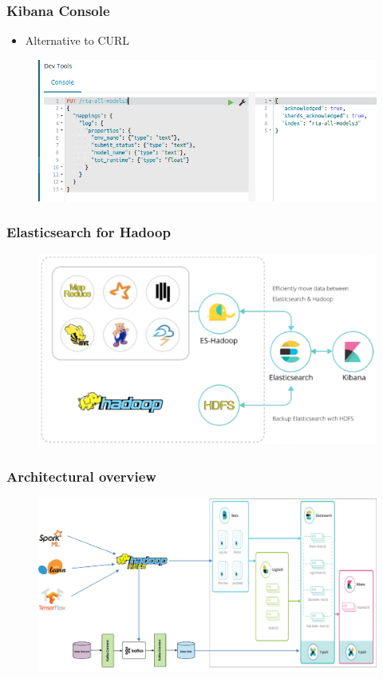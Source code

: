 \documentclass[11pt]{beamer}
\begin{document}
\begin{frame}
\frametitle{Kibana Console}
\begin{itemize}
	\item Alternative to CURL
\end{itemize}
\begin{figure}[h]
	\includegraphics[scale=.5]{images/kibana3}
\end{figure}
\end{frame}

\begin{frame}
\frametitle{Elasticsearch for Hadoop}
\begin{figure}[h]
	\includegraphics[scale=.3]{images/es_hdp}
\end{figure}
\end{frame}

\begin{frame}
\frametitle{Architectural overview}
\begin{figure}[h]
	\includegraphics[scale=.3]{images/arch1}
\end{figure}
\end{frame}
\end{document}
